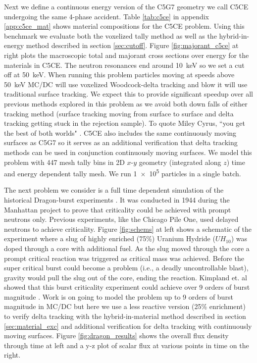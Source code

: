 Next we define a continuous energy version of the C5G7 geometry we call C5CE undergoing the same 4-phase accident.
Table \ref{tab:c5ce} in appendix \ref{app:c5ce_mat} shows material compositions for the C5CE problem.
Using this benchmark we evaluate both the voxelized tally method as well as the hybrid-in-energy method described in section \ref{sec:cutoff}.
Figure \ref{fig:majorant_c5ce} at right plots the macroscopic total and majorant cross sections over energy for the materials in C5CE.
The neutron resonances end around \SI{10}{\kilo\electronvolt} so we set a cut off at \SI{50}{\kilo\electronvolt}.
When running this problem particles moving at speeds above \SI{50}{\kilo\electronvolt} MC/DC will use voxelized Woodcock-delta tracking and blow it will use traditional surface tracking.
We expect this to provide significant speedup over all previous methods explored in this problem as we avoid both down falls of either tracking method (surface tracking moving from surface to surface and delta tracking getting stuck in the rejection sample). 
To quote Miley Cyrus, ``you get the best of both worlds" \cite{cyrus_best_2005}.
C5CE also includes the same continuously moving surfaces as C5G7 so it serves as an additional verification that delta tracking methods can be used in conjunction continuously moving surfaces.
We model this problem with \num{447} mesh tally bins in 2D $x$-$y$ geometry (integrated along $z$) time and energy dependent tally mesh.
We run \num{1e5} particles in a single batch.

The next problem we consider is a full time dependent simulation of the historical Dragon-burst experiments \cite{kimpland2021dragon}.
It was conducted in 1944 during the Manhattan project to prove that criticality could be achieved with prompt neutrons only.
Previous experiments, like the Chicago Pile One, used delayed neutrons to achieve criticality.
Figure \ref{fig:schems} at left shows a schematic of the experiment where a slug of highly enriched (75\%) Uranium Hydride ($UH_{10}$) was doped through a core with additional fuel.
As the slug moved through the core a prompt critical reaction was triggered as critical mass was achieved.
Before the super critical burst could become a problem (i.e., a deadly uncontrollable blast), gravity would pull the slug out of the core, ending the reaction.
Kimpland et. al showed that this burst criticality experiment could achieve over 9 orders of burst magnitude \cite{kimpland2021dragon}.
Work is on going to model the problem up to 9 orders of burst magnitude in MC/DC but here we use a less reactive version (25\% enrichment) to verify delta tracking with the hybrid-in-material method described in section \ref{sec:material_exc} and additional verification for delta tracking with continuously moving surfaces.
Figure \ref{fig:dragon_results} shows the overall flux density through time at left and a y-z plot of scalar flux at various points in time on the right.

